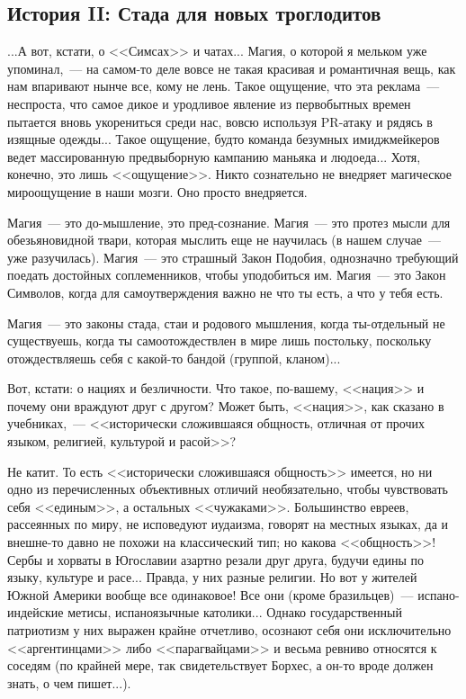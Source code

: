 \documentclass{scrbook}
\newcommand{\flqq}{<<}
\newcommand{\frqq}{>>}
\newcommand{\mdash}{~--- }
\newcommand{\commamdash}{~--- } %
\newcommand{\essaysection}[1]{\subsection*{#1}\nopagebreak}
\begin{document}
\essaysection{История II: Стада для новых троглодитов}

...А вот, кстати, о {\flqq}Симсах{\frqq} и чатах... Магия, о которой я мельком уже упоминал,{\commamdash}на самом-то деле вовсе не такая красивая и романтичная вещь, как нам впаривают нынче все, кому не лень. Такое ощущение, что эта реклама{\mdash}неспроста, что самое дикое и уродливое явление из первобытных времен пытается вновь укорениться среди нас, вовсю используя PR-атаку и рядясь в изящные одежды... Такое ощущение, будто команда безумных имиджмейкеров ведет массированную предвыборную кампанию маньяка и людоеда... Хотя, конечно, это лишь {\flqq}ощущение{\frqq}. Никто сознательно не внедряет магическое мироощущение в наши мозги. Оно просто внедряется.

Магия{\mdash}это до-мышление, это пред-сознание. Магия{\mdash}это протез мысли для обезьяновидной твари, которая мыслить еще не научилась (в нашем случае{\mdash}уже разучилась). Магия{\mdash}это страшный Закон Подобия, однозначно требующий поедать достойных соплеменников, чтобы уподобиться им. Магия{\mdash}это Закон Символов, когда для самоутверждения важно не что ты есть, а что у тебя есть.

Магия{\mdash}это законы стада, стаи и родового мышления, когда ты-отдельный не существуешь, когда ты самоотождествлен в мире лишь постольку, поскольку отождествляешь себя с какой-то бандой (группой, кланом)...

Вот, кстати: о нациях и безличности. Что такое, по-вашему, {\flqq}нация{\frqq} и почему они враждуют друг с другом? Может быть, {\flqq}нация{\frqq}, как сказано в учебниках,{\commamdash}{\flqq}исторически сложившаяся общность, отличная от прочих языком, религией, культурой и расой{\frqq}?

Не катит. То есть {\flqq}исторически сложившаяся общность{\frqq} имеется, но ни одно из перечисленных объективных отличий необязательно, чтобы чувствовать себя {\flqq}единым{\frqq}, а остальных {\flqq}чужаками{\frqq}. Большинство евреев, рассеянных по миру, не исповедуют иудаизма, говорят на местных языках, да и внешне-то давно не похожи на классический тип; но какова {\flqq}общность{\frqq}! Сербы и хорваты в Югославии азартно резали друг друга, будучи едины по языку, культуре и расе... Правда, у них разные религии. Но вот у жителей Южной Америки вообще все одинаковое! Все они (кроме бразильцев){\mdash}испано-индейские метисы, испаноязычные католики... Однако государственный патриотизм у них выражен крайне отчетливо, осознают себя они исключительно {\flqq}аргентинцами{\frqq} либо {\flqq}парагвайцами{\frqq} и весьма ревниво относятся к соседям (по крайней мере, так свидетельствует Борхес, а он-то вроде должен знать, о чем пишет...).
\end{document}
